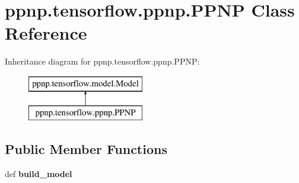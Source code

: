 \hypertarget{classppnp_1_1tensorflow_1_1ppnp_1_1PPNP}{}\section{ppnp.\+tensorflow.\+ppnp.\+P\+P\+NP Class Reference}
\label{classppnp_1_1tensorflow_1_1ppnp_1_1PPNP}
Inheritance diagram for ppnp.\+tensorflow.\+ppnp.\+P\+P\+NP\+:\begin{figure}[H]
\begin{center}
\leavevmode
\includegraphics[height=2.000000cm]{classppnp_1_1tensorflow_1_1ppnp_1_1PPNP}
\end{center}
\end{figure}
\subsection*{Public Member Functions}
\begin{DoxyCompactItemize}
\item 
\mbox{\label{classppnp_1_1tensorflow_1_1ppnp_1_1PPNP_af31b3686f77048ae18ebfd164fe1e0be}} 
def {\bfseries build\+\_\+model}
\end{DoxyCompactItemize}
